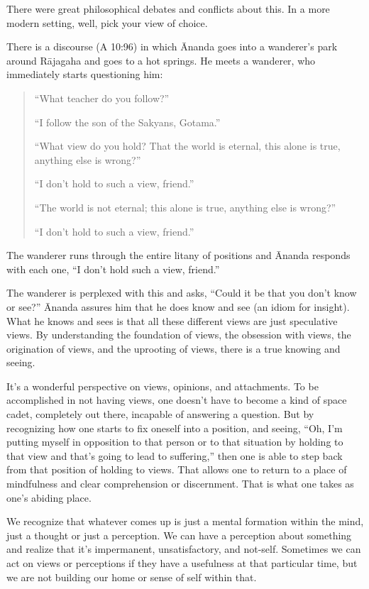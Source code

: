 There were great philosophical debates and conflicts about this. In a
more modern setting, well, pick your view of choice.

There is a discourse (A 10:96) in which Ānanda goes into a wanderer’s
park around Rājagaha and goes to a hot springs. He meets a wanderer, who
immediately starts questioning him:

\begin{quotation}
“What teacher do you follow?”

“I follow the son of the Sakyans, Gotama.”

“What view do you hold? That the world is eternal, this alone is true,
anything else is wrong?”

“I don’t hold to such a view, friend.”

“The world is not eternal; this alone is true, anything else is wrong?”

“I don’t hold to such a view, friend.”
\end{quotation}

The wanderer runs through the entire litany of positions and Ānanda
responds with each one, “I don’t hold such a view, friend.”

The wanderer is perplexed with this and asks, “Could it be that you
don’t know or see?” Ānanda assures him that he does know and see (an
idiom for insight). What he knows and sees is that all these different
views are just speculative views. By understanding the foundation of
views, the obsession with views, the origination of views, and the
uprooting of views, there is a true knowing and seeing.

It’s a wonderful perspective on views, opinions, and attachments. To be
accomplished in not having views, one doesn’t have to become a kind of
space cadet, completely out there, incapable of answering a question.
But by recognizing how one starts to fix oneself into a position, and
seeing, “Oh, I’m putting myself in opposition to that person or to that
situation by holding to that view and that’s going to lead to
suffering,” then one is able to step back from that position of holding
to views. That allows one to return to a place of mindfulness and clear
comprehension or discernment. That is what one takes as one’s abiding
place.

We recognize that whatever comes up is just a mental formation within
the mind, just a thought or just a perception. We can have a perception
about something and realize that it’s impermanent, unsatisfactory, and
not-self. Sometimes we can act on views or perceptions if they have a
usefulness at that particular time, but we are not building our home or
sense of self within that.

